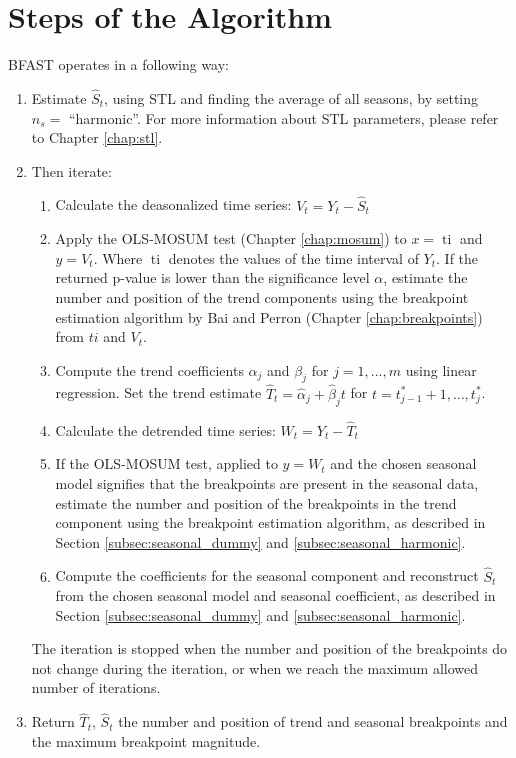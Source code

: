 \documentclass[main.tex]{subfiles}
\begin{document}
\section{Steps of the Algorithm}
\label{sec:bfast_algorithm_steps}
BFAST operates in a following way:
\begin{enumerate}
\item Estimate $\hat{S}_t$, using STL and finding the average of all seasons, by
  setting $n_s =$ ``harmonic''. For more information about STL parameters,
  please refer to Chapter \ref{chap:stl}.
\item Then iterate:
  \begin{enumerate}[1)]
    \item Calculate the deasonalized time series: $V_t = Y_t - \hat{S}_t$
    \item Apply the OLS-MOSUM test (Chapter \ref{chap:mosum}) to $x=\operatorname{ti}$ and
      $y = V_t$. Where $\operatorname{ti}$ denotes the values of the time interval of $Y_t$.
      If the returned p-value is lower than the significance level $\alpha$,
      estimate the number and position of the trend components using the
      breakpoint estimation algorithm by Bai and Perron (Chapter
      \ref{chap:breakpoints}) from $ti$ and $V_t$.
    \item Compute the trend coefficients $\alpha_j$ and $\beta_j$ for
      $j = 1, \hdots, m$ using linear regression. Set the trend estimate
      $\hat{T}_t = \hat{\alpha}_j + \hat{\beta}_j t$ for
      $t = t^*_{j-1} + 1, \hdots, t^*_j$.
    \item Calculate the detrended time series: $W_t = Y_t - \hat{T}_t$
    \item If the OLS-MOSUM test, applied to $y=W_t$ and
      the chosen seasonal model signifies that the breakpoints are present in the
      seasonal data, estimate the number and position of the
      breakpoints in the trend component using the breakpoint estimation
      algorithm, as described in Section \ref{subsec:seasonal_dummy} and
      \ref{subsec:seasonal_harmonic}.
    \item Compute the coefficients for the seasonal component
      and reconstruct $\hat{S}_t$ from the chosen seasonal model and seasonal
      coefficient, as described in Section \ref{subsec:seasonal_dummy} and
      \ref{subsec:seasonal_harmonic}.
  \end{enumerate}
  The iteration is stopped when the number and position of the breakpoints do
  not change during the iteration, or when we reach the maximum allowed number of iterations.
\item Return $\hat{T}_t$, $\hat{S}_t$ the number and position of trend and
  seasonal breakpoints and the maximum breakpoint magnitude.
\end{enumerate}
\end{document}
